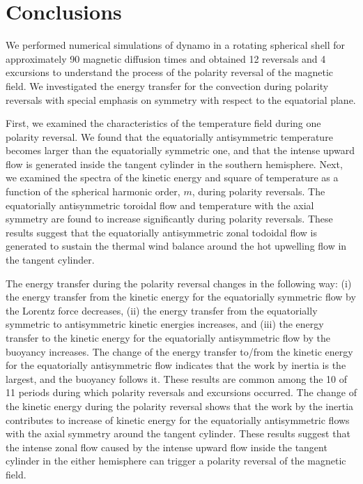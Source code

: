 \section{Conclusions}
\label{section:conclusions}

We performed numerical simulations of dynamo in a rotating spherical shell for approximately 90 magnetic diffusion times and obtained 12 reversals and 4 excursions to understand the process of the polarity reversal of the magnetic field. 
{\color{red}
We investigated the energy transfer for the convection during polarity reversals with special emphasis on symmetry with respect to the equatorial plane.
}

First, we examined the characteristics of the temperature field during one polarity reversal. 
We found that the equatorially antisymmetric temperature becomes larger than the equatorially symmetric one, and that the intense upward flow is generated inside the tangent cylinder in the southern hemisphere. 
{\color{red}
Next, we examined the spectra of the kinetic energy and square of temperature as a function of the spherical harmonic order, $m$, during polarity reversals. 
The equatorially antisymmetric toroidal flow and temperature with the axial symmetry are found to increase significantly during polarity reversals.
}
These results suggest that the equatorially antisymmetric zonal todoidal flow is generated to sustain the thermal wind balance around the hot upwelling flow in the tangent cylinder.

The energy transfer during the polarity reversal changes in the following way: 
(i) the energy transfer from the kinetic energy for the equatorially symmetric flow by the Lorentz force decreases, 
(ii) the energy transfer from the equatorially symmetric to antisymmetric kinetic energies increases, and (iii) the energy transfer to the kinetic energy for the equatorially antisymmetric flow by the buoyancy increases. 
The change of the energy transfer to/from the kinetic energy for the equatorially antisymmetric flow indicates that the work by inertia is the largest, and the buoyancy follows it. 
These results are common among the 10 of 11 periods during which polarity reversals and excursions occurred. 
The change of the kinetic energy during the polarity reversal shows that the work by the inertia contributes to increase of kinetic energy for the equatorially antisymmetric flows with the axial symmetry around the tangent cylinder. 
{\color{red}
These results suggest that the intense zonal flow caused by the intense upward flow inside the tangent cylinder in the either hemisphere can trigger a polarity reversal of the magnetic field.
}
